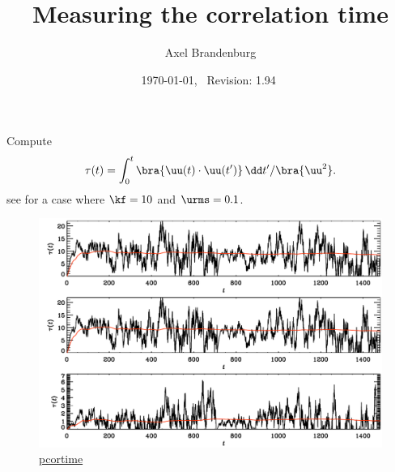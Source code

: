 \documentclass{article}
\title{Measuring the correlation time}
\author{Axel Brandenburg}
\date{\today,~ $ $Revision: 1.94 $ $}
\begin{document}
\maketitle




Compute
\begin{equation}
\tau(t)=\int_0^t \bra{\uu(t)\cdot\uu(t')}\,\dd t'/\bra{\uu^2}.
\end{equation}
see  for a case where $\kf=10$ and $\urms=0.1$.

\begin{figure}[h!]\begin{center}
\includegraphics[width=\columnwidth]{pcortime}
\end{center}\caption[]{
\url{pcortime}
}\label{pcortime}\end{figure}





\end{document}
